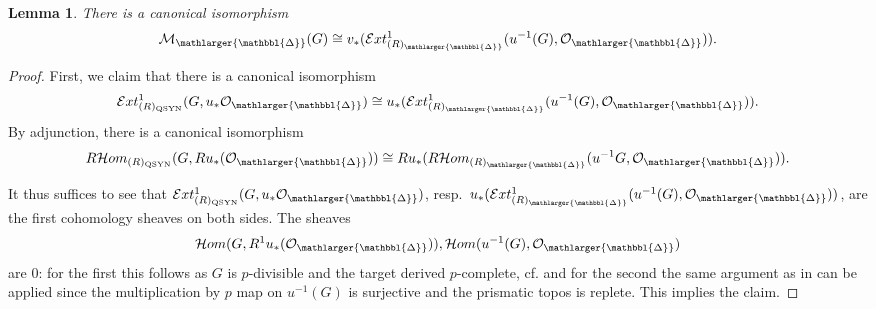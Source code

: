 \documentclass{amsart}
\newcommand{\prism}{{\mathlarger{\mathbbl{\Delta}}}}
\theoremstyle{plain}
\newtheorem{lemma}[theorem]{Lemma}
\theoremstyle{definition}
\newcommand{\red}[1]{{\color{black} #1}}
\newcommand{\blue}[1]{{\color{black}#1}}
\begin{document}
\begin{lemma}
  \label{sec:divid-prism-dieud-lemma-divided-dieudonne-module-via-local-ext-on-prismatic-site} There is a canonical isomorphism
  $$
      \mathcal{M}_{\prism}(G)\cong v_\ast(\mathcal{E}xt^1_{(R)_\prism}(u^{-1}(G),\mathcal{O}_\prism)).
  $$
\end{lemma}
\begin{proof}
First, we claim that there is a canonical isomorphism
  $$
    \mathcal{E}xt^1_{(R)_{\mathrm{QSYN}}}(G,u_\ast \mathcal{O}_\prism)\cong u_\ast(\mathcal{E}xt^1_{(R)_\prism}(u^{-1}(G),\mathcal{O}_\prism)).
    $$
    By adjunction, there is a canonical isomorphism
    \[      
      R\mathcal{H}om_{(R)_{\mathrm{QSYN}}}(G,Ru_\ast(\mathcal{O}_{\prism}))\cong Ru_\ast(R\mathcal{H}om_{(R)_\prism}(u^{-1}G,\mathcal{O}_\prism)).
    \]
  
  
   It thus suffices to see that $\mathcal{E}xt^1_{(R)_{\mathrm{QSYN}}}(G,u_\ast \mathcal{O}_\prism)$, resp.\ $u_\ast(\mathcal{E}xt^1_{(R)_\prism}(u^{-1}(G),\mathcal{O}_\prism))$, are the first cohomology sheaves on both sides.
  The sheaves
  $$
  \mathcal{H}om(G,R^1u_\ast(\mathcal{O}_\prism)), \mathcal{H}om(u^{-1}(G),\mathcal{O}_\prism)
  $$
  are $0$: \blue{for the first this follows as $G$ is $p$-divisible and the target \red{derived $p$-complete, cf. \Cref{no-hom-btw-o-pris-and-G}} and for the second the same argument as in  \Cref{no-hom-btw-o-pris-and-G} can be applied since the multiplication by $p$ map on $u^{-1}(G)$ is surjective and the prismatic topos is replete}. This implies the claim. 
  

\end{proof}
\end{document}
